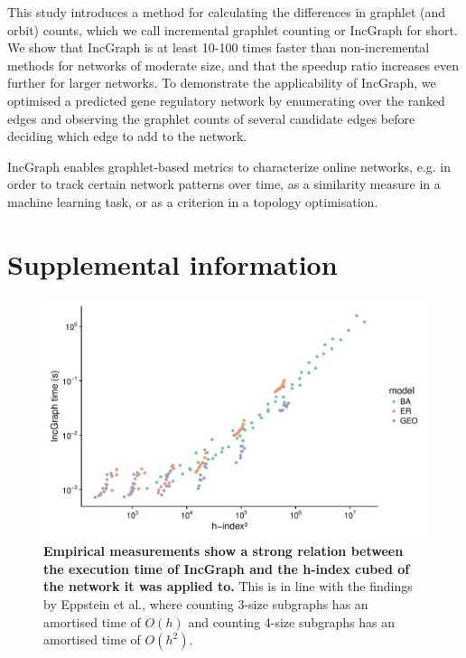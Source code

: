 This study introduces a method for calculating the differences in graphlet (and orbit) counts, which we call incremental graphlet counting or IncGraph for short. We show that IncGraph is at least 10-100 times faster than non-incremental methods for networks of moderate size, and that the speedup ratio increases even further for larger networks. 
To demonstrate the applicability of IncGraph, we optimised a predicted gene regulatory network by enumerating over the ranked edges and observing the graphlet counts of several candidate edges before deciding which edge to add to the network.

IncGraph enables graphlet-based metrics to characterize online networks, e.g. in order to track certain network patterns over time, as a similarity measure in a machine learning task, or as a criterion in a topology optimisation.


\section{Supplemental information}

\newcommand{\pluseq}{\mathrel{+}=}
\newcommand{\asteq}{\mathrel{*}=}

\begin{figure}[htb!]
	\centering
	\includegraphics[width=.8\linewidth]{fig/figureS1.pdf} 
	\caption{
		\textbf{Empirical measurements show a strong relation between the execution time of IncGraph and the h-index cubed of the network it was applied to.} This is in line with the findings by Eppstein et al., where counting 3-size subgraphs has an amortised time of $O(h)$ and counting 4-size subgraphs has an amortised time of $O(h^2)$.
	}
	\label{sfig_hindex}
\end{figure}

